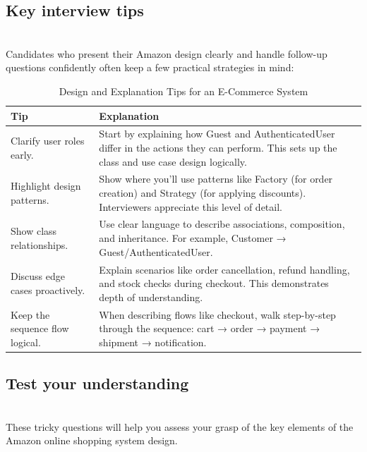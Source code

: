 \subsection{Key interview tips}\label{QkZEP8Eb5_Dg3vom-pNDp}
\\
Candidates who present their Amazon design clearly and handle follow-up questions confidently often keep a few practical strategies in mind:

\begin{table}[h!]
\centering
\begin{tabular}{|p{6cm}|p{9cm}|}
\hline
\textbf{Tip} & \textbf{Explanation} \\
\hline
Clarify user roles early. & 
Start by explaining how Guest and AuthenticatedUser differ in the actions they can perform. This sets up the class and use case design logically. \\
\hline
Highlight design patterns. & 
Show where you’ll use patterns like Factory (for order creation) and Strategy (for applying discounts). Interviewers appreciate this level of detail. \\
\hline
Show class relationships. & 
Use clear language to describe associations, composition, and inheritance. For example, Customer → Guest/AuthenticatedUser. \\
\hline
Discuss edge cases proactively. & 
Explain scenarios like order cancellation, refund handling, and stock checks during checkout. This demonstrates depth of understanding. \\
\hline
Keep the sequence flow logical. & 
When describing flows like checkout, walk step-by-step through the sequence: cart → order → payment → shipment → notification. \\
\hline
\end{tabular}
\caption{Design and Explanation Tips for an E-Commerce System}
\label{tab:ecommerce_design_tips}
\end{table}


\subsection{Test your understanding}\label{dbQNcs3NoX2h-MysO4rJV}
\\
These tricky questions will help you assess your grasp of the key elements of the Amazon online shopping system design.

